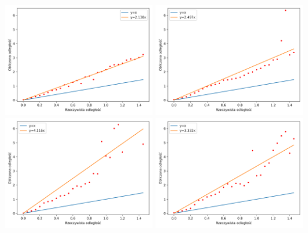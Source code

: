 \begin{frame}
            \includegraphics[width=0.49\textwidth]{../pics/mic_sync_dist/dists_close_long_0_mean.png}
            \includegraphics[width=0.49\textwidth]{../pics/mic_sync_dist/dists_close_long_1_mean.png}
            \includegraphics[width=0.49\textwidth]{../pics/mic_sync_dist/dists_close_long_2_mean.png}
            \includegraphics[width=0.49\textwidth]{../pics/mic_sync_dist/dists_close_long_3_mean.png}
\end{frame}
